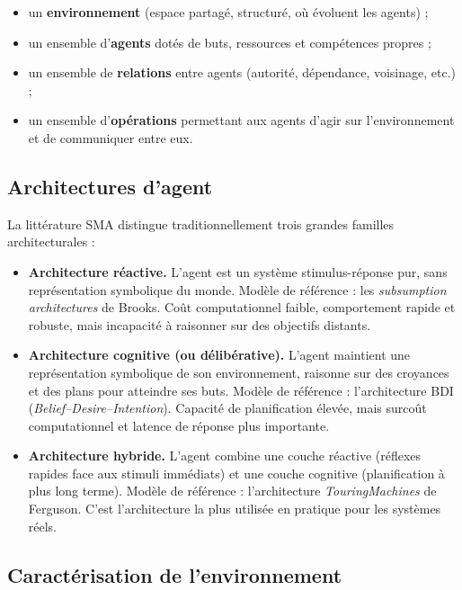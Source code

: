 \begin{itemize}[leftmargin=*]
    \item un \textbf{environnement} (espace partagé, structuré, où évoluent les agents) ;
    \item un ensemble d'\textbf{agents} dotés de buts, ressources et compétences propres ;
    \item un ensemble de \textbf{relations} entre agents (autorité, dépendance, voisinage, etc.) ;
    \item un ensemble d'\textbf{opérations} permettant aux agents d'agir sur l'environnement et de communiquer entre eux.
\end{itemize}

\subsection{Architectures d'agent}

La littérature SMA distingue traditionnellement trois grandes familles architecturales :

\begin{itemize}[leftmargin=*]
    \item \textbf{Architecture réactive.} L'agent est un système stimulus-réponse pur, sans représentation symbolique du monde. Modèle de référence : les \emph{subsumption architectures} de Brooks. Coût computationnel faible, comportement rapide et robuste, mais incapacité à raisonner sur des objectifs distants.
    \item \textbf{Architecture cognitive (ou délibérative).} L'agent maintient une représentation symbolique de son environnement, raisonne sur des croyances et des plans pour atteindre ses buts. Modèle de référence : l'architecture BDI (\emph{Belief--Desire--Intention}). Capacité de planification élevée, mais surcoût computationnel et latence de réponse plus importante.
    \item \textbf{Architecture hybride.} L'agent combine une couche réactive (réflexes rapides face aux stimuli immédiats) et une couche cognitive (planification à plus long terme). Modèle de référence : l'architecture \emph{TouringMachines} de Ferguson. C'est l'architecture la plus utilisée en pratique pour les systèmes réels.
\end{itemize}

\subsection{Caractérisation de l'environnement}


